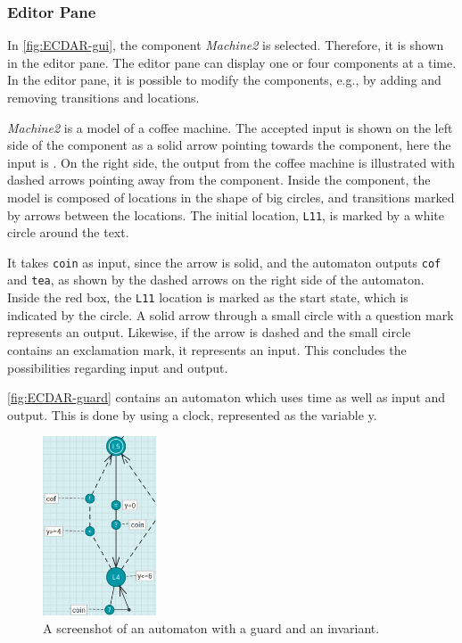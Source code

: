 \subsubsection{Editor Pane}
In \autoref{fig:ECDAR-gui}, the component \textit{Machine2} is selected. Therefore, it is shown in the editor pane. The editor pane can display one or four components at a time.
In the editor pane, it is possible to modify the components, e.g., by adding and removing transitions and locations.


\textit{Machine2} is a model of a coffee machine. The accepted input is shown on the left side of the component as a solid arrow pointing towards the component, here the input is \te. On the right side, the output from the coffee machine is illustrated with dashed arrows pointing away from the component. 
Inside the component, the model is composed of locations in the shape of big circles, and transitions marked by arrows between the locations. The initial location, \texttt{L11}, is marked by a white circle around the text. 


It takes \texttt{coin} as input, since the arrow is solid, and the automaton outputs \texttt{cof} and \texttt{tea}, as shown by the dashed arrows on the right side of the automaton.
Inside the red box, the \texttt{L11} location is marked as the start state, which is indicated by the circle.
A solid arrow through a small circle with a question mark represents an output. 
Likewise, if the arrow is dashed and the small circle contains an exclamation mark, it represents an input.
This concludes the possibilities regarding input and output.

\autoref{fig:ECDAR-guard} contains an automaton which uses time as well as input and output.
This is done by using a clock, represented as the variable y.
\begin{figure}[H]
    \centering
    \includegraphics[width=0.3\textwidth]{common/figures/ecdar-guards.jpg}
    \caption{A screenshot of an automaton with a guard and an invariant.}
    \label{fig:ECDAR-guard}
\end{figure}

